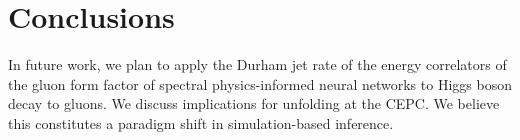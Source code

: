 \section{Conclusions}\label{sec:conclusions}

In future work, we plan to apply the Durham jet rate of the energy
correlators of the gluon form factor of spectral physics-informed neural
networks to Higgs boson decay to gluons. We discuss implications for
unfolding at the CEPC. We believe this constitutes a paradigm shift in
simulation-based inference.

